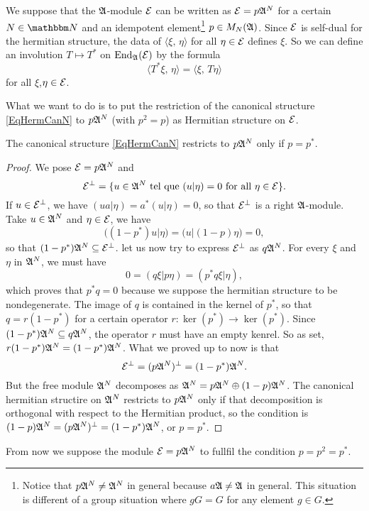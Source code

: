 We suppose that the $\mathfrak{A}$-module $\mathcal{E}$ can be written as $\mathcal{E}=p\mathfrak{A}^N$ for a certain $N\in \eN$ and an idempotent element\footnote{Notice that $p\mathfrak{A}^N\neq\mathfrak{A}^N$ in general because $a\mathfrak{A}\neq\mathfrak{A}$ in general. This situation is different of a group situation where $gG=G$ for any element $g\in G$.} $p\in M_N(\mathfrak{A})$. Since $\mathcal{E}$ is self-dual for the hermitian structure, the data of $\langle \xi,\,\eta\rangle$ for all $\eta\in\mathcal{E}$ defines $\xi$. So we can define an involution $T\mapsto T^*$ on $\operatorname{End}_{\mathfrak{A}}(\mathcal{E})$ by the formula
\[ 
  \langle T^*\xi,\,\eta\rangle=\langle \xi,\,T\eta\rangle
\]
for all $\xi$,$\eta\in\mathcal{E}$.

What we want to do is to put the restriction of the canonical structure \eqref{EqHermCanN} to $p\mathfrak{A}^N$ (with $p^2=p$) as Hermitian structure on $\mathcal{E}$. 

\begin{proposition}
The canonical structure \eqref{EqHermCanN} restricts to $p\mathfrak{A}^N$ only if $p=p^*$.
\end{proposition}

\begin{proof}
We pose $\mathcal{E}=p\mathfrak{A}^N$ and 
\[ 
  \mathcal{E}^{\perp}=\{ u\in\mathfrak{A}^N\text{ tel que } (u|\eta)=0\text{ for all $\eta\in\mathcal{E}$} \}.
\]
If $u\in\mathcal{E}^{\perp}$, we have $(ua|\eta)=a^*(u|\eta)=0$, so that $\mathcal{E}^{\perp}$ is a right $\mathfrak{A}$-module. Take $u\in\mathfrak{A}^N$ and $\eta\in\mathcal{E}$, we have
\[ 
  \big( (1-p^*)u | \eta\big) =\big( u | (1-p)\eta\big) =0,
\]
so that $(1-p^*)\mathfrak{A}^N\subseteq\mathcal{E}^{\perp}$. let us now try to express $\mathcal{E}^{\perp}$ as $q\mathfrak{A}^N$. For every $\xi$ and $\eta$ in $\mathfrak{A}^N$, we must have
\[ 
  0=( q\xi | p\eta) =( p^*q\xi | \eta),
\]
which proves that $p^*q=0$ because we suppose the hermitian structure to be nondegenerate. The image of $q$ is contained in the kernel of $p^*$, so that $q=r(1-p^*)$ for a certain operator $r\colon \ker(p^*)\to \ker(p^*)$. Since $(1-p^*)\mathfrak{A}^N\subseteq q\mathfrak{A}^N$, the operator $r$ must have an empty kenrel. So as set, $r(1-p^*)\mathfrak{A}^N=(1-p^*)\mathfrak{A}^N$. What we proved up to now is that
\[ 
  \mathcal{E}^{\perp}=(p\mathfrak{A}^N)^{\perp}=(1-p^*)\mathfrak{A}^N.
\]
But the free module $\mathfrak{A}^N$ decomposes as $\mathfrak{A}^N=p\mathfrak{A}^N\oplus (1-p)\mathfrak{A}^N$. The canonical hermitian structire on $\mathfrak{A}^N$ restricts to $p\mathfrak{A}^N$ only if that decomposition is orthogonal with respect to the Hermitian product, so the condition is $(1-p)\mathfrak{A}^N=(p\mathfrak{A}^N)^{\perp}=(1-p^*)\mathfrak{A}^N$, or $p=p^*$.
\end{proof}

From now we suppose the module $\mathcal{E}=p\mathfrak{A}^N$ to fullfil the condition $p=p^2=p^*$.

